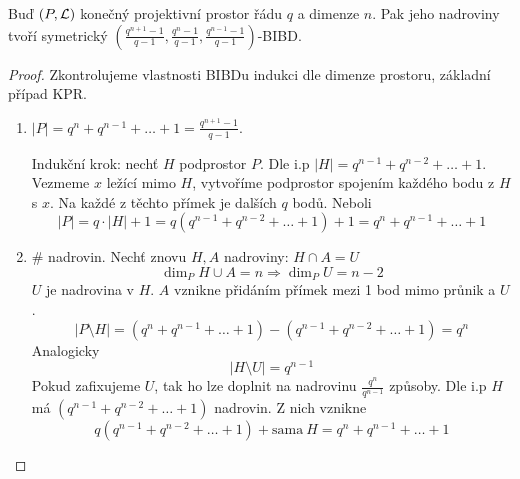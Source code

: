 \begin{theorem}
    Buď $(P,\operatorname{\mathcal{L}})$ konečný projektivní prostor řádu $q$ a dimenze $n$.
    Pak jeho nadroviny tvoří symetrický $(\frac{q^{n+1}-1}{q-1},\frac{q^n-1}{q-1},\frac{q^{n-1}-1}{q-1})$-BIBD.
\end{theorem}
\begin{proof}
	Zkontrolujeme vlastnosti BIBDu indukci dle dimenze prostoru, základní případ KPR.
    \begin{enumerate}
	    \item $|P| = q^n + q^{n - 1} + \ldots + 1 = \frac{q^{n+1}-1}{q-1}$.

		    Indukční krok: nechť $H$ podprostor $P$.
		    Dle i.p $|H| = q^{n - 1} + q^{n - 2} + \ldots + 1$.
		    Vezmeme $x$ ležící mimo $H$, vytvoříme podprostor spojením každého bodu z $H$ s $x$.
		    Na každé z těchto přímek je dalších $q$ bodů.
		    Neboli
		    \[ |P| = q \cdot |H| + 1 = q(q^{n - 1} + q^{n - 2} + \ldots + 1) + 1 = q^n + q^{n - 1} + \ldots + 1 \]
	    \item \# nadrovin.
		    Nechť znovu $H, A$ nadroviny: $H \cap A = U$
		    \[ \dim_P H \cup A = n \Rightarrow \dim_P U = n - 2 \]
		    $U$ je nadrovina v $H$.
		    $A$ vznikne přidáním přímek mezi 1 bod mimo průnik a $U$.
		    \[ |P \setminus H| = (q^n + q^{n - 1} + \ldots + 1) - (q^{n - 1} + q^{n - 2} + \ldots + 1) = q^n \]
		    Analogicky
		    \[ |H \setminus U| = q^{n - 1} \]
		    Pokud zafixujeme $U$, tak ho lze doplnit na nadrovinu $\frac{q^n}{q^{n - 1}}$ způsoby.
		    Dle i.p $H$ má $(q^{n - 1} + q^{n - 2} + \ldots + 1)$ nadrovin.
		    Z nich vznikne
		    \[ q(q^{n - 1} + q^{n - 2} + \ldots + 1) + \text{sama}\ H = q^n + q^{n - 1} + \ldots + 1 \]

    \end{enumerate}
\end{proof}

